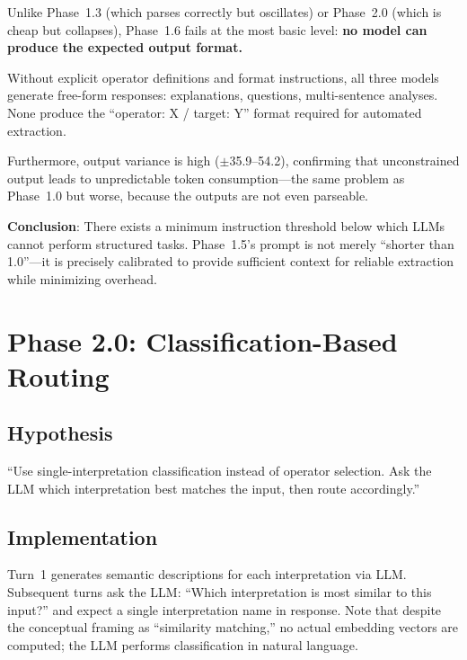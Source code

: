 \documentclass[11pt,a4paper]{article}
\begin{document}
Unlike Phase~1.3 (which parses correctly but oscillates) or Phase~2.0
(which is cheap but collapses), Phase~1.6 fails at the most basic level:
\textbf{no model can produce the expected output format.}

Without explicit operator definitions and format instructions, all three models
generate free-form responses: explanations, questions, multi-sentence analyses.
None produce the ``operator: X / target: Y'' format required for automated
extraction.

Furthermore, output variance is high ($\pm$35.9--54.2), confirming that
unconstrained output leads to unpredictable token consumption---the same problem
as Phase~1.0 but worse, because the outputs are not even parseable.

\textbf{Conclusion}: There exists a minimum instruction threshold below which
LLMs cannot perform structured tasks. Phase~1.5's prompt is not merely
``shorter than 1.0''---it is precisely calibrated to provide sufficient context
for reliable extraction while minimizing overhead.

\section{Phase 2.0: Classification-Based Routing}
\label{sec:phase2_0}

\subsection{Hypothesis}

``Use single-interpretation classification instead of operator selection. Ask the LLM
which interpretation best matches the input, then route accordingly.''

\subsection{Implementation}

Turn~1 generates semantic descriptions for each interpretation via LLM.
Subsequent turns ask the LLM: ``Which interpretation is most similar to
this input?'' and expect a single interpretation name in response. Note that
despite the conceptual framing as ``similarity matching,'' no actual embedding
vectors are computed; the LLM performs classification in natural language.
\end{document}
